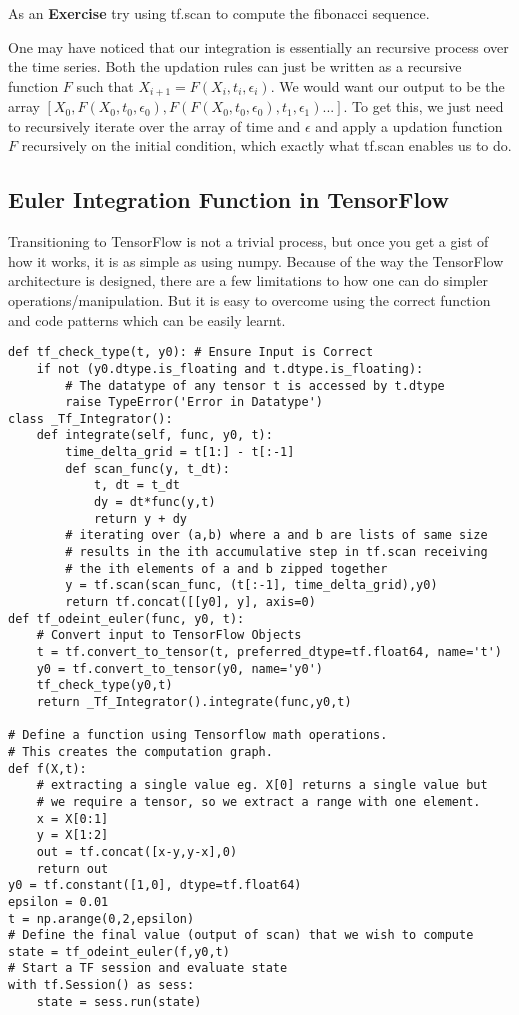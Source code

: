 \documentclass[10pt,letterpaper]{article}
\begin{document}
As an \textbf{Exercise} try using tf.scan to compute the fibonacci sequence.

One may have noticed that our integration is essentially an recursive process over the time series. Both the updation rules can just be written as a recursive function $F$ such that $X_{i+1}=F(X_i,t_i,\epsilon_i)$. We would want our output to be the array $[X_0,F(X_0,t_0,\epsilon_0),F(F(X_0,t_0,\epsilon_0),t_1,\epsilon_1)...]$. To get this, we just need to recursively iterate over the array of time and $\epsilon$ and apply a updation function $F$ recursively on the initial condition, which exactly what tf.scan enables us to do.

\subsection*{Euler Integration Function in TensorFlow}

Transitioning to TensorFlow is not a trivial process, but once you get a gist of how it works, it is as simple as using numpy. Because of the way the TensorFlow architecture is designed, there are a few limitations to how one can do simpler operations/manipulation. But it is easy to overcome using the correct function and code patterns which can be easily learnt.

\begin{verbatim}
def tf_check_type(t, y0): # Ensure Input is Correct
    if not (y0.dtype.is_floating and t.dtype.is_floating): 
        # The datatype of any tensor t is accessed by t.dtype
        raise TypeError('Error in Datatype')
class _Tf_Integrator():
    def integrate(self, func, y0, t): 
        time_delta_grid = t[1:] - t[:-1]  
        def scan_func(y, t_dt): 
            t, dt = t_dt
            dy = dt*func(y,t)
            return y + dy
        # iterating over (a,b) where a and b are lists of same size
        # results in the ith accumulative step in tf.scan receiving
        # the ith elements of a and b zipped together
        y = tf.scan(scan_func, (t[:-1], time_delta_grid),y0) 
        return tf.concat([[y0], y], axis=0)
def tf_odeint_euler(func, y0, t):
    # Convert input to TensorFlow Objects
    t = tf.convert_to_tensor(t, preferred_dtype=tf.float64, name='t')
    y0 = tf.convert_to_tensor(y0, name='y0')
    tf_check_type(y0,t)
    return _Tf_Integrator().integrate(func,y0,t)
    
# Define a function using Tensorflow math operations. 
# This creates the computation graph.
def f(X,t):
    # extracting a single value eg. X[0] returns a single value but
    # we require a tensor, so we extract a range with one element.
    x = X[0:1] 
    y = X[1:2]
    out = tf.concat([x-y,y-x],0)
    return out
y0 = tf.constant([1,0], dtype=tf.float64)
epsilon = 0.01
t = np.arange(0,2,epsilon)
# Define the final value (output of scan) that we wish to compute
state = tf_odeint_euler(f,y0,t)
# Start a TF session and evaluate state
with tf.Session() as sess:
    state = sess.run(state)
\end{verbatim}
\end{document}
